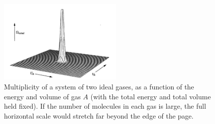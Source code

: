 \documentclass[11pt]{exam}
\begin{document}
\begin{figure}[htp]
    \centering
    \includegraphics[width=6cm]{figure18.png}
    \caption{Multiplicity of a system of two ideal gases, as a function of the energy and volume of gas $A$ (with the total energy and total volume held fixed). If the number of molecules in each gas is large, the full horizontal scale would stretch far beyond the edge of the page.}
\label{fig:3d-plot}
\end{figure}
\end{document}
